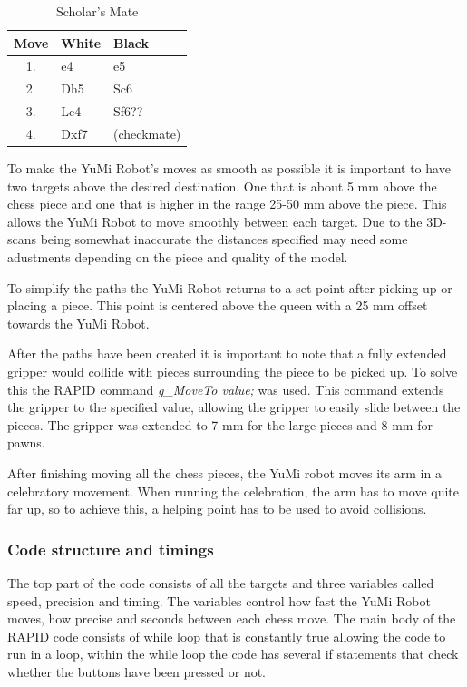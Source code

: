 \documentclass[a4paper,12pt]{article}
\begin{document}
\begin{table}[h] %
    \centering
    \begin{tabular}{c l l}
        \hline
        Move & White & Black \\
        \hline
        1. & e4 & e5 \\
        2. & Dh5 & Sc6 \\
        3. & Lc4 & Sf6?? \\
        4. & Dxf7 & (checkmate) \\
        \hline
    \end{tabular}
    \caption{Scholar's Mate}
    \label{tab:chess_moves}
\end{table}
To make the YuMi Robot's moves as smooth as possible it is important to have two targets above the desired destination. One that is about 5 mm above the chess piece and one that is higher in the range 25-50 mm above the piece. This allows the YuMi Robot to move smoothly between each target. Due to the 3D-scans being somewhat inaccurate the distances specified may need some adustments depending on the piece and quality of the model.

To simplify the paths the YuMi Robot returns to a set point after picking up or placing a piece. This point is centered above the queen with a 25 mm offset towards the YuMi Robot. 

After the paths have been created it is important to note that a fully extended gripper would collide with pieces surrounding the piece to be picked up. To solve this the RAPID command \textit{g\_MoveTo value;} was used. This command extends the gripper to the specified value, allowing the gripper to easily slide between the pieces. The gripper was extended to 7 mm for the large pieces and 8 mm for pawns.

After finishing moving all the chess pieces, the YuMi robot moves its arm in a celebratory movement. When running the celebration, the arm has to move quite far up, so to achieve this, a helping point has to be used to avoid collisions.

\subsubsection{Code structure and timings}
The top part of the code consists of all the targets and three variables called speed, precision and timing. The variables control how fast the YuMi Robot moves, how precise and seconds between each  chess move. The main body of the RAPID code consists of while loop that is constantly true allowing the code to run in a loop, within the while loop the code has several if statements that check whether the buttons have been pressed or not. 
\end{document}

